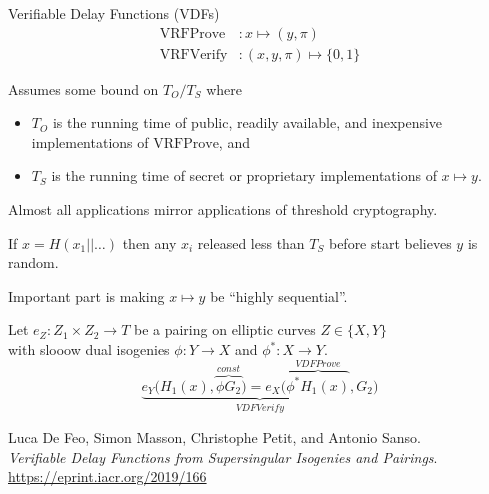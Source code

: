 \documentclass[fleqn,xcolor={usenames,dvipsnames},notes,aspectratio=169]{beamer} %
\begin{document}
\def\seed{x} %

\begin{frame}[t]{Verifiable Delay Functions (VDFs)}
\vspace{-20pt}
\begin{align*}
\mathrm{VRFProve} &: \seed \mapsto (y,\pi) \\
\mathrm{VRFVerify} &: (\seed,y,\pi) \mapsto \{0,1\} 
\end{align*}

\medskip

Assumes some bound on $T_O/T_S$ where
\begin{itemize}
\item $T_O$ is the running time of public, readily available, and inexpensive implementations of $\mathrm{VRFProve}$, and \\
\item $T_S$ is the running time of secret or proprietary implementations of $x \mapsto y$.
\end{itemize}

\bigskip

Almost all applications mirror applications of threshold cryptography. \\ \medskip

If $\seed = H(\seed_1 || \ldots)$ then any $\seed_i$ released less than $T_S$ before start believes $y$ is random. 

\bigskip\bigskip

Important part is making $\seed \mapsto y$ be ``highly sequential''.

\end{frame}


\begin{frame}[t]
 
Let $e_Z : Z_1 \times Z_2 \to T$ be a pairing on elliptic curves $Z \in \{ X, Y \}$ \\ \smallskip
with slooow dual isogenies $\phi : Y \to X$ and $\phi^* : X \to Y$. \\

\bigskip
$$ 
\underbrace{
 e_Y \bigl( H_1(\seed), \overbrace{\phi G_2}^{const} \bigr)
=
 e_X \bigl( \overbrace{\phi^* H_1(\seed)}^{VDFProve}, G_2 \bigr)
}_{VDFVerify}
$$

\bigskip
\bigskip

Luca De Feo, Simon Masson, Christophe Petit, and Antonio Sanso. \\
{\it Verifiable Delay Functions from Supersingular Isogenies and Pairings}.
\url{https://eprint.iacr.org/2019/166}

\end{frame}
\end{document}
